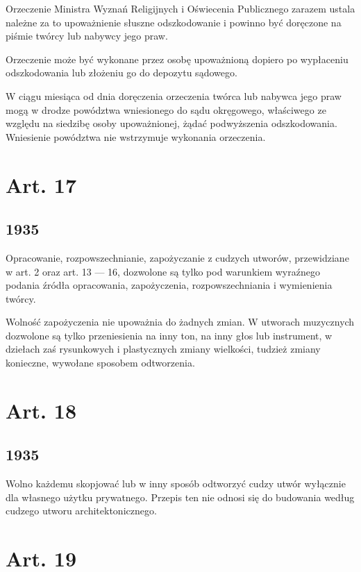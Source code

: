 \documentclass[withmarginpar]{book}
\begin{document}
Orzeczenie Ministra Wyznań Religijnych i Oświecenia Publicznego
zarazem ustala należne za to upoważnienie słuszne odszkodowanie i
powinno być doręczone na piśmie twórcy lub nabywcy jego praw.

Orzeczenie może być wykonane przez osobę upoważnioną dopiero po
wypłaceniu odszkodowania lub złożeniu go do depozytu sądowego.

W ciągu miesiąca od dnia doręczenia orzeczenia twórca lub nabywca jego
praw mogą w drodze powództwa wniesionego do sądu okręgowego,
właściwego ze względu na siedzibę osoby upoważnionej, żądać
podwyższenia odszkodowania. Wniesienie powództwa nie wstrzymuje
wykonania orzeczenia.

\section{Art. 17}
\label{sec:art.-17}
\subsection{1935}
\label{sec:art.-17-1}

Opracowanie, rozpowszechnianie, zapożyczanie z cudzych utworów,
przewidziane w art. 2 oraz art. 13 — 16, dozwolone są tylko pod
warunkiem wyraźnego podania źródła opracowania, zapożyczenia,
rozpowszechniania i wymienienia twórcy.

Wolność zapożyczenia nie upoważnia do żadnych zmian. W utworach
muzycznych dozwolone są tylko przeniesienia na inny ton, na inny głos
lub instrument, w dziełach zaś rysunkowych i plastycznych zmiany
wielkości, tudzież zmiany konieczne, wywołane sposobem odtworzenia.

\section{Art. 18}
\label{sec:art.-18}
\subsection{1935}
\label{sec:art.-18-1}

Wolno każdemu skopjować lub w inny sposób odtworzyć cudzy utwór
wyłącznie dla własnego użytku prywatnego. Przepis ten nie odnosi się
do budowania według cudzego utworu architektonicznego.

\section{Art. 19}
\label{sec:art.-19}
\end{document}
